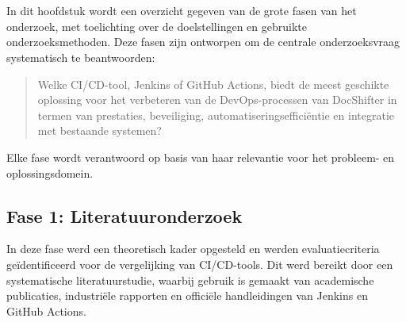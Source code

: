 
\chapter{}%
\label{ch:methodologie}


In dit hoofdstuk wordt een overzicht gegeven van de grote fasen van het onderzoek, met toelichting over de doelstellingen en gebruikte onderzoeksmethoden. Deze fasen zijn ontworpen om de centrale onderzoeksvraag systematisch te beantwoorden:

\begin{quote}
    Welke CI/CD-tool, Jenkins of GitHub Actions, biedt de meest geschikte oplossing voor het verbeteren van de DevOps-processen van DocShifter in termen van prestaties, beveiliging, automatiseringsefficiëntie en integratie met bestaande systemen?
\end{quote}

Elke fase wordt verantwoord op basis van haar relevantie voor het probleem- en oplossingsdomein.

\section{Fase 1: Literatuuronderzoek}
In deze fase werd een theoretisch kader opgesteld en werden evaluatiecriteria geïdentificeerd voor de vergelijking van CI/CD-tools. Dit werd bereikt door een systematische literatuurstudie, waarbij gebruik is gemaakt van academische publicaties, industriële rapporten en officiële handleidingen van Jenkins en GitHub Actions.


